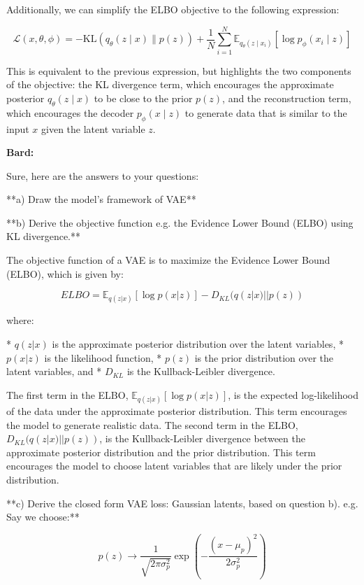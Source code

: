 \documentclass{homework}
\begin{document}
Additionally, we can simplify the ELBO objective to the following expression:

$$
\mathcal{L}(x, \theta, \phi) = -\mathrm{KL}\left(q_{\theta}(z \mid x) \| p(z) \right) + \frac{1}{N} \sum_{i=1}^{N} \mathbb{E}_{q_{\theta}(z \mid x_i)} \left[ \log p_{\phi}(x_i \mid z) \right]
$$

This is equivalent to the previous expression, but highlights the two components of the objective: the KL divergence term, which encourages the approximate posterior $q_{\theta}(z \mid x)$ to be close to the prior $p(z)$, and the reconstruction term, which encourages the decoder $p_{\phi}(x \mid z)$ to generate data that is similar to the input $x$ given the latent variable $z$.

\textbf{Bard:}

Sure, here are the answers to your questions:

**a) Draw the model's framework of VAE**


**b) Derive the objective function e.g. the Evidence Lower Bound (ELBO) using KL divergence.**

The objective function of a VAE is to maximize the Evidence Lower Bound (ELBO), which is given by:

$$
ELBO = \mathbb{E}_{q(z|x)}[\log p(x|z)] - D_{KL}(q(z|x) || p(z))
$$

where:

* $q(z|x)$ is the approximate posterior distribution over the latent variables,
* $p(x|z)$ is the likelihood function,
* $p(z)$ is the prior distribution over the latent variables, and
* $D_{KL}$ is the Kullback-Leibler divergence.

The first term in the ELBO, $\mathbb{E}_{q(z|x)}[\log p(x|z)]$, is the expected log-likelihood of the data under the approximate posterior distribution. This term encourages the model to generate realistic data. The second term in the ELBO, $D_{KL}(q(z|x) || p(z))$, is the Kullback-Leibler divergence between the approximate posterior distribution and the prior distribution. This term encourages the model to choose latent variables that are likely under the prior distribution.

**c) Derive the closed form VAE loss: Gaussian latents, based on question b). e.g. Say we choose:**

$$
p(z) \rightarrow \frac{1}{\sqrt{2 \pi \sigma_{p}^{2}}} \exp \left(-\frac{\left(x-\mu_{p}\right)^{2}}{2 \sigma_{p}^{2}}\right)
$$
\end{document}
